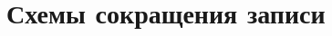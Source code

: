 \documentclass[14pt, twoside]{extreport}
\newcounter{problem_type}[chapter]
\newcounter{zadacha}[problem_type]
\newcommand{\z}{\vspace{0.5cm}\par\addtocounter{zadacha}{1}%
\textit{\arabic{chapter}.\arabic{problem_type}.\arabic{zadacha}}~~  }
\newcommand{\head}[1]{\vspace{1cm}\subsubsection*{#1}}
\newcommand{\zhead}[1]{\head{#1} \refstepcounter{problem_type}}
\begin{document}


\section{Схемы сокращения записи}
\end{document}
